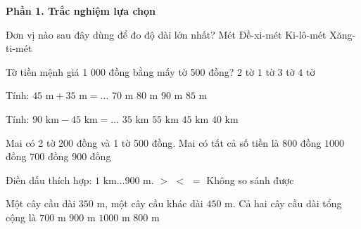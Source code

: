 \textbf{Phần 1. Trắc nghiệm lựa chọn}

\begin{ex} %
Đơn vị nào sau đây dùng để đo độ dài lớn nhất?
\choice
{Mét}
{Đề-xi-mét}
{\True Ki-lô-mét}
{Xăng-ti-mét}
\end{ex}

\begin{ex} %
Tờ tiền mệnh giá 1 000 đồng bằng mấy tờ 500 đồng?
\choice
{\True $2$ tờ}
{$1$ tờ}
{$3$ tờ}
{$4$ tờ}
\end{ex}

\begin{ex} %
Tính: $45\text{ m} + 35\text{ m} = \dots$
\choice
{$70\text{ m}$}
{\True $80\text{ m}$}
{$90\text{ m}$}
{$85\text{ m}$}
\end{ex}

\begin{ex} %
Tính: $90\text{ km} - 45\text{ km} = \dots$
\choice
{$35\text{ km}$}
{$55\text{ km}$}
{\True $45\text{ km}$}
{$40\text{ km}$}
\end{ex}

\begin{ex} %
Mai có 2 tờ 200 đồng và 1 tờ 500 đồng. Mai có tất cả số tiền là
\choice
{$800$ đồng}
{$1000$ đồng}
{$700$ đồng}
{\True $900$ đồng}
\end{ex}

\begin{ex} %
Điền dấu thích hợp: $1\text{ km} \dots 900\text{ m}$.
\choice
{\True $>$}
{$<$}
{$=$}
{Không so sánh được}
\end{ex}

\begin{ex} %
Một cây cầu dài $350\text{ m}$, một cây cầu khác dài $450\text{ m}$. Cả hai cây cầu dài tổng cộng là
\choice
{$700\text{ m}$}
{$900\text{ m}$}
{$1000\text{ m}$}
{\True $800\text{ m}$}
\end{ex}

